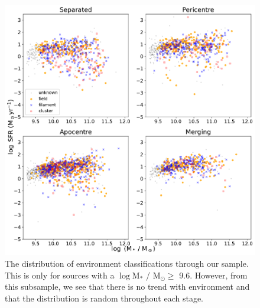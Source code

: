 \begin{figure}
\centering
\includegraphics[width=\textwidth]{Chapter3/figures/sfr-mass-density.pdf}
\caption[The distribution of environment classifications through our sample.]{The distribution of environment classifications through our sample. This is only for sources with a $\log$M$_*$ / M$_\odot \geq$ 9.6. However, from this subsample, we see that there is no trend with environment and that the distribution is random throughout each stage.}
\label{fig:dens-sfr-mass}
\end{figure}

